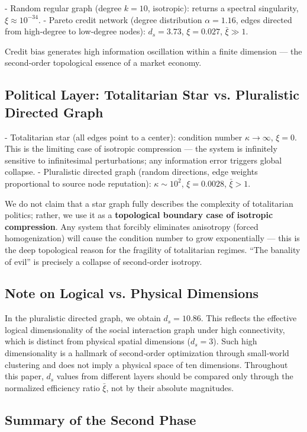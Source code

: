 \documentclass[12pt,a4paper]{article}
\begin{document}
- Random regular graph (degree $k=10$, isotropic): returns a spectral singularity, $\xi\approx10^{-34}$.
- Pareto credit network (degree distribution $\alpha=1.16$, edges directed from high‑degree to low‑degree nodes): $d_s=3.73$, $\xi=0.027$, $\bar{\xi}\gg1$.

Credit bias generates high information oscillation within a finite dimension — the second‑order topological essence of a market economy.

\subsection{Political Layer: Totalitarian Star vs. Pluralistic Directed Graph}

- Totalitarian star (all edges point to a center): condition number $\kappa\to\infty$, $\xi=0$. This is the limiting case of isotropic compression — the system is infinitely sensitive to infinitesimal perturbations; any information error triggers global collapse.
- Pluralistic directed graph (random directions, edge weights proportional to source node reputation): $\kappa\sim10^2$, $\xi=0.0028$, $\bar{\xi}>1$.

We do not claim that a star graph fully describes the complexity of totalitarian politics; rather, we use it as a \textbf{topological boundary case of isotropic compression}. Any system that forcibly eliminates anisotropy (forced homogenization) will cause the condition number to grow exponentially — this is the deep topological reason for the fragility of totalitarian regimes. “The banality of evil” is precisely a collapse of second‑order isotropy.

\subsection{Note on Logical vs. Physical Dimensions}

In the pluralistic directed graph, we obtain $d_s=10.86$. This reflects the effective logical dimensionality of the social interaction graph under high connectivity, which is distinct from physical spatial dimensions ($d_s=3$). Such high dimensionality is a hallmark of second‑order optimization through small‑world clustering and does not imply a physical space of ten dimensions. Throughout this paper, $d_s$ values from different layers should be compared only through the normalized efficiency ratio $\bar{\xi}$, not by their absolute magnitudes.

\subsection{Summary of the Second Phase}
\end{document}
